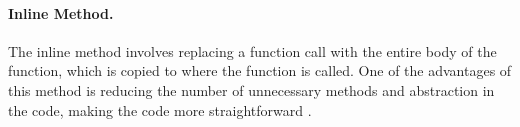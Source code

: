 \paragraph{Inline Method.}

The inline method involves replacing a function call with the entire body of 
the function, which is copied to where the function is called. One of the 
advantages of this method is reducing the number of unnecessary methods and 
abstraction in the code, making the code more straightforward
\citep{refactorbook}.

